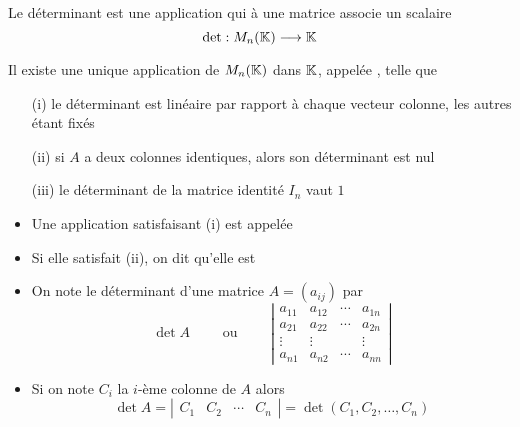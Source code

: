 \begin{frame}
Le déterminant est une application qui à une matrice associe un scalaire
$$\det : M_n(\mathbb{K}) \longrightarrow \mathbb{K}$$

\pause

\begin{theoreme}
\label{th:def:determinant}
Il existe une unique application de $M_n(\mathbb{K})$ dans $\mathbb{K}$, 
appelée , telle que
\begin{itemize}
  \item[(i)]\pause le déterminant est linéaire par rapport à chaque
vecteur colonne, les autres étant fixés 
  \item[(ii)]\pause si $A$ a deux colonnes identiques, 
alors son déterminant est nul 
  \item[(iii)]\pause le déterminant de la matrice identité $I_n$ vaut $1$
\end{itemize}
\end{theoreme}
\pause
\begin{remarque}
\begin{itemize}
  \item Une application satisfaisant (i) est appelée 
  
  \item\pause Si elle satisfait (ii), on dit qu'elle est 
  
\end{itemize} 
\end{remarque}

\end{frame}


\begin{frame}

\begin{itemize}
  \item On note le  déterminant d'une matrice $A = (a_{ij})$ par
$$
\det A \qquad \text{ ou } \qquad
\left|\begin{array}{cccc}
a_{11} & a_{12} & \cdots & a_{1n} \\
a_{21} & a_{22} & \cdots & a_{2n} \\
\vdots & \vdots &  & \vdots \\
a_{n1} & a_{n2} & \cdots & a_{nn}
\end{array}\right|$$

  \item \pause Si on note $C_{i}$ la $i$-ème colonne de $A$ alors
$$\det A=\left|\begin{matrix}
C_1&C_2&\cdots&C_n
\end{matrix}\right|
 = \det (C_1,C_2,\ldots,C_n) 
$$
\end{itemize}
\end{frame}


